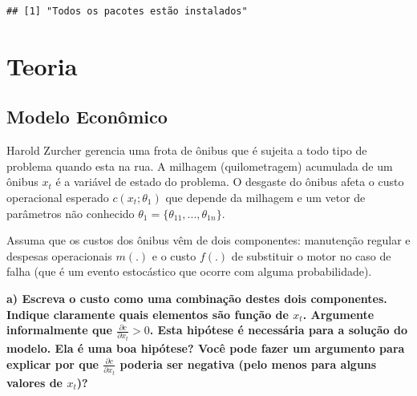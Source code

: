 \documentclass[12pt,a4paper]{article}
\newenvironment{Shaded}{\begin{snugshade}}{\end{snugshade}}
\newcommand{\CommentTok}[1]{\textcolor[rgb]{0.56,0.35,0.01}{\textit{#1}}}
\newcommand{\DataTypeTok}[1]{\textcolor[rgb]{0.13,0.29,0.53}{#1}}
\newcommand{\KeywordTok}[1]{\textcolor[rgb]{0.13,0.29,0.53}{\textbf{#1}}}
\newcommand{\NormalTok}[1]{#1}
\newcommand{\OperatorTok}[1]{\textcolor[rgb]{0.81,0.36,0.00}{\textbf{#1}}}
\newcommand{\OtherTok}[1]{\textcolor[rgb]{0.56,0.35,0.01}{#1}}
\begin{document}
\begin{verbatim}
## [1] "Todos os pacotes estão instalados"
\end{verbatim}

\begin{Shaded}
\end{Shaded}

\hypertarget{teoria}{%
\section{Teoria}\label{teoria}}

\hypertarget{modelo-economico}{%
\subsection{Modelo Econômico}\label{modelo-economico}}

Harold Zurcher gerencia uma frota de ônibus que é sujeita a todo tipo de
problema quando esta na rua. A milhagem (quilometragem) acumulada de um
ônibus \(x_t\) é a variável de estado do problema. O desgaste do ônibus
afeta o custo operacional esperado \(c(x_t; \theta_1)\) que depende da
milhagem e um vetor de parâmetros não conhecido
\(\theta_1 = \{\theta_{11}, . . . , \theta_{1n}\}\).

Assuma que os custos dos ônibus vêm de dois componentes: manutenção
regular e despesas operacionais \(m(.)\) e o custo \(f(.)\) de
substituir o motor no caso de falha (que é um evento estocástico que
ocorre com alguma probabilidade).

\textbf{a) Escreva o custo como uma combinação destes dois componentes.
Indique claramente quais elementos são função de \(x_t\). Argumente
informalmente que \(\frac{\partial c}{\partial x_t} > 0\). Esta hipótese
é necessária para a solução do modelo. Ela é uma boa hipótese? Você pode
fazer um argumento para explicar por que
\(\frac{\partial c}{\partial x_t}\) poderia ser negativa (pelo menos
para alguns valores de \(x_t\))?}
\end{document}
